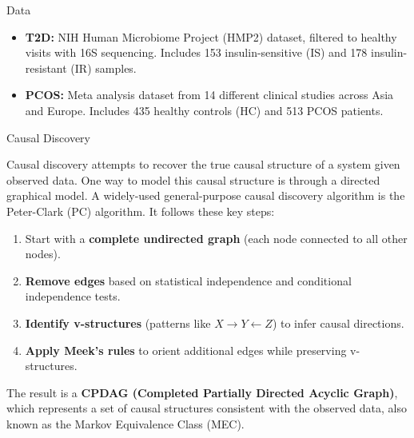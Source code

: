 \documentclass[final]{beamer}
\newlength{\colwidth}
\begin{document}
\begin{frame}[t]
\begin{columns}[t]
\begin{column}{\colwidth}
\begin{block}{Data}
    
    \begin{itemize}
      \item \textbf{T2D:} NIH Human Microbiome Project (HMP2) dataset, filtered to healthy visits with 16S sequencing. Includes 153 insulin-sensitive (IS) and 178 insulin-resistant (IR) samples.
      \item \textbf{PCOS:} Meta analysis dataset from 14 different clinical studies across Asia and Europe. Includes 435 healthy controls (HC) and 513 PCOS patients.
    \end{itemize}

  \end{block}
  
	  \begin{alertblock}{Causal Discovery}
	  
	  	Causal discovery attempts to recover the true causal structure of a system given observed data. One way to model this causal structure is through a directed graphical model. A widely-used general-purpose causal discovery algorithm is the Peter-Clark (PC) algorithm. It follows these key steps:
		\begin{enumerate}
		    \item Start with a \textbf{complete undirected graph} (each node connected to all other nodes).
		    \item \textbf{Remove edges} based on statistical independence and conditional independence tests.
		    \item \textbf{Identify v-structures} (patterns like $X \to Y \leftarrow Z$) to infer causal directions.
		    \item \textbf{Apply Meek’s rules} to orient additional edges while preserving v-structures.
		\end{enumerate}

	The result is a \textbf{CPDAG (Completed Partially Directed Acyclic Graph)}, which represents a set of causal structures consistent with the observed data, also known as the Markov Equivalence Class (MEC). 

	  

\end{alertblock}
\end{column}
\end{columns}
\end{frame}
\end{document}
